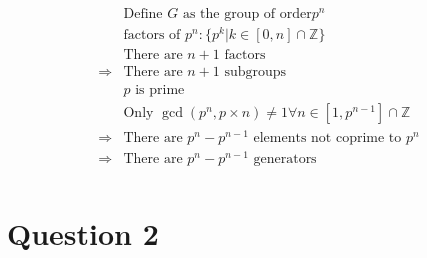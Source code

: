 \documentclass{article}
\begin{document}
~

\begin{equation*}
    \begin{split}
        &\text{Define } G\text{ as the group of order}p^n\\
        &\text{factors of }p^n:\{p^k|k\in[0,n]\cap\mathbb{Z}\}\\
        &\text{There are }n+1\text{ factors}\\
        \Rightarrow&\text{There are }n+1\text{ subgroups}\\
        &p\text{ is prime}\\
        &\text{Only }\gcd(p^n,p\times n)\ne 1\forall n\in[1, p^{n-1}]\cap\mathbb{Z}\\
        \Rightarrow&\text{There are }p^n-p^{n-1}\text{ elements not coprime to }p^n\\
        \Rightarrow&\text{There are }p^n-p^{n-1}\text{ generators}\\
    \end{split}
\end{equation*}

\newpage

\section*{Question 2}

~
\end{document}
